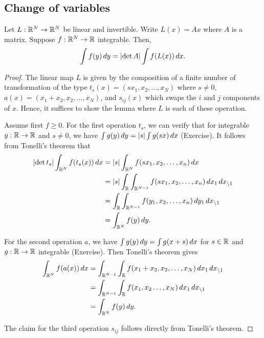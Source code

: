 \documentclass[a4paper]{article}
\begin{document}
\subsection{Change of variables}

\begin{lemma}

  Let $L : \mathbb{R}^N \to \mathbb{R}^N$ be linear and invertible. Write $L(x) = Ax$
  where $A$ is a matrix. Suppose $f : \mathbb{R}^N \to \mathbb{R}$ integrable. Then,
  \[
    \int f(y) \, d y = \left\lvert \det A\right\rvert \int f(L(x)) \, d x.
  \]
\end{lemma}

\begin{proof}

  The linear map $L$ is given by the composition of a finite number of
  transformation of the type $t_s(x) = (s x_1, x_2, \dots, x_N)$ where $s
  \neq 0$, $a(x) = (x_1 + x_2, x_2, \dots, x_N)$, and $s_{ij} (x)$ which
  swaps the $i$ and $j$ components of $x$. Hence, it suffices to show the
  lemma where $L$ is each of these operation.

  Assume first $f \geq 0$. For the first operation $t_s$, we can verify
  that for integrable $g : \mathbb{R} \to \mathbb{R}$ and $s \neq 0$, we have $\int g(y)
  \, d y = \left\lvert s\right\rvert \int g(s x) \, d x$ (Exercise). It follows from Tonelli's
  theorem that
  \begin{align*}
    \left\lvert \det t_s\right\rvert \int_{\mathbb{R}^N} f(t_s(x)) \, d x
     & = \left\lvert s\right\rvert \int_{\mathbb{R}^N} f(s x_1, x_2, \dots, x_n) \, d x                                      \\
     & = \left\lvert s\right\rvert \int_{\mathbb{R}} \int_{\mathbb{R}^{N - 1}} f(s x_1, x_2, \dots, x_n) \, d x_1 \, d x_{\setminus 1} \\
     & = \int_{\mathbb{R}} \int_{\mathbb{R}^{N - 1}}  f(y_1, x_2, \dots, x_n) \, d y_1 \, d x_{\setminus 1}          \\
     & = \int_{\mathbb{R}^N} f(y) \, d y.
  \end{align*}

  For the second operation $a$, we have $\int g(y) \, d y = \int g(x + s) \, d
  x$ for $s \in \mathbb{R}$ and $g : \mathbb{R} \to \mathbb{R}$ integrable (Exercise). Then
  Tonelli's theorem gives
  \begin{align*}
    \int_{\mathbb{R}^N} f(a(x)) \, d x
     & = \int_{\mathbb{R}^{N - 1}} \int_{\mathbb{R}} f(x_1 + x_2, x_2, \dots, x_N) \, d x_1 \, d x_{\setminus 1} \\
     & = \int_{\mathbb{R}^{N - 1}} \int_{\mathbb{R}} f(x_1, x_2 \dots, x_N) \, d x_1 \, d x_{\setminus 1}        \\
     & = \int_{\mathbb{R}^N} f(y) \, d y.
  \end{align*}

  The claim for the third operation $s_{ij}$ follows directly from
  Tonelli's theorem.
\end{proof}
\end{document}
